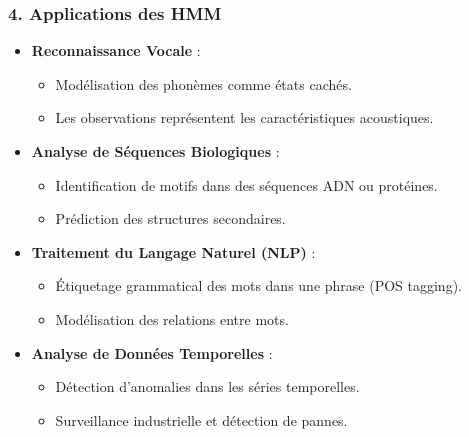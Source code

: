 \documentclass[a4paper,12pt,oneside]{report}	%
\begin{document}
            \subsubsection{4. Applications des HMM}
                \begin{itemize}
                    \item \textbf{Reconnaissance Vocale} :
                        \begin{itemize}
                            \item Modélisation des phonèmes comme états cachés.
                            \item Les observations représentent les caractéristiques acoustiques.
                        \end{itemize}
                    \item \textbf{Analyse de Séquences Biologiques} :
                        \begin{itemize}
                            \item Identification de motifs dans des séquences ADN ou protéines.
                            \item Prédiction des structures secondaires.
                        \end{itemize}
                    \item \textbf{Traitement du Langage Naturel (NLP)} :
                        \begin{itemize}
                            \item Étiquetage grammatical des mots dans une phrase (POS tagging).
                            \item Modélisation des relations entre mots.
                        \end{itemize}
                    \item \textbf{Analyse de Données Temporelles} :
                        \begin{itemize}
                            \item Détection d'anomalies dans les séries temporelles.
                            \item Surveillance industrielle et détection de pannes.
                        \end{itemize}
                \end{itemize}
\end{document}
